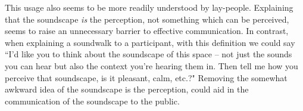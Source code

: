 This usage also seems to be more readily understood by lay-people. Explaining that the soundscape \emph{is} the perception, not something which can be perceived, seems to raise an unnecessary barrier to effective communication. In contrast, when explaining a soundwalk to a participant, with this definition we could say ``I'd like you to think about the soundscape of this space -- not just the sounds you can hear but also the context you're hearing them in. Then tell me how you perceive that soundscape, is it pleasant, calm, etc.?" Removing the somewhat awkward idea of the soundscape is the perception, could aid in the communication of the soundscape to the public.